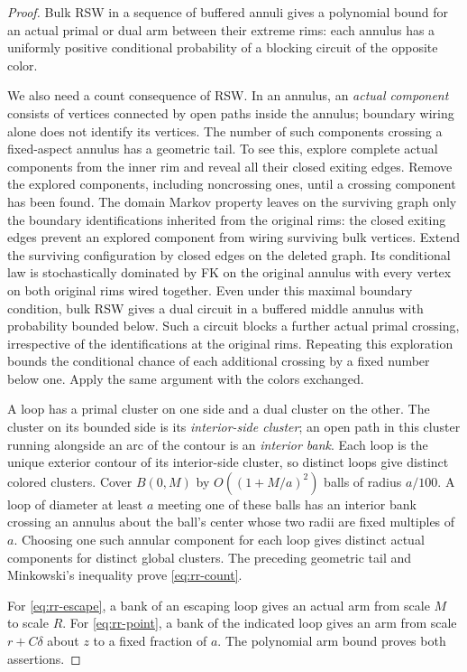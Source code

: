 \begin{proof}
Bulk RSW in a sequence of buffered annuli gives a polynomial bound
for an actual primal or dual arm between their extreme rims: each
annulus has a uniformly positive conditional probability of a
blocking circuit of the opposite color.

We also need a count consequence of RSW.  In an annulus, an
\emph{actual component} consists of vertices connected by open paths
inside the annulus; boundary wiring alone does not identify its
vertices.  The number of such components crossing a fixed-aspect
annulus has a geometric tail.  To see this, explore complete actual
components from the inner rim and reveal all their closed exiting
edges.  Remove the explored components, including noncrossing ones,
until a crossing component has been found.  The domain Markov property
leaves on the surviving graph only the boundary identifications inherited
from the original rims: the closed exiting edges prevent an explored
component from wiring surviving bulk vertices.  Extend the surviving
configuration by closed edges on the deleted graph.  Its conditional law
is stochastically dominated by FK on the original annulus with every
vertex on both original rims wired together.  Even under this maximal
boundary condition, bulk RSW gives a dual circuit in a buffered middle
annulus with probability bounded below.  Such a circuit blocks a
further actual primal crossing, irrespective of the identifications at
the original rims.  Repeating this exploration bounds the conditional
chance of each additional crossing by a fixed number below one.
Apply the same argument with the colors exchanged.

A loop has a primal cluster on one side and a dual cluster on the
other. The cluster on its bounded side is its \emph{interior-side
cluster}; an open path in this cluster running alongside an arc of
the contour is an \emph{interior bank}. Each loop is the unique exterior
contour of its interior-side cluster, so distinct loops give distinct
colored clusters. Cover $B(0,M)$ by $O((1+M/a)^2)$ balls of radius
$a/100$.
A loop of diameter at least $a$ meeting one of these balls has an
interior bank crossing an annulus about the ball's center whose two
radii are fixed multiples of $a$.  Choosing one such annular component
for each loop gives distinct actual components for distinct global
clusters.
The preceding geometric tail and Minkowski's inequality prove
\eqref{eq:rr-count}.

For \eqref{eq:rr-escape}, a bank of an escaping loop gives an
actual arm from scale $M$ to scale $R$.  For \eqref{eq:rr-point}, a
bank of the indicated loop gives an arm from scale $r+C\delta$
about $z$ to a fixed fraction of $a$.  The polynomial arm bound
proves both assertions.
\end{proof}

